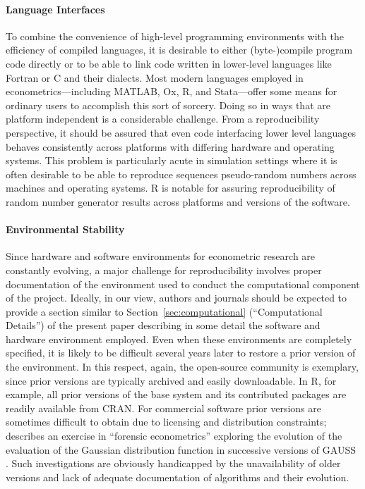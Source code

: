 \documentclass[10pt,a4paper,twoside]{article}
\let\proglang=\textsf
\begin{document}
\paragraph{Language Interfaces}
To combine the convenience of high-level programming environments with 
the efficiency of compiled languages, it is desirable to either (byte-)compile
program code directly or to be able to link code written in lower-level
languages like \proglang{Fortran} or \proglang{C} and their dialects.
Most modern languages employed in econometrics---including \proglang{MATLAB},
\proglang{Ox}, \proglang{R}, and \proglang{Stata}---offer some means
for ordinary users to accomplish this sort of sorcery. Doing so in ways that
are platform independent is a considerable challenge. From a reproducibility
perspective, it should be assured that even code interfacing lower level languages
behaves consistently across platforms with differing hardware and operating systems.
This problem is particularly acute in simulation settings where it is often
desirable to be able to reproduce sequences pseudo-random numbers across machines
and operating systems. \proglang{R} is notable for assuring reproducibility
of random number generator results across platforms and versions of the software.
 
\paragraph{Environmental Stability}
Since hardware and software environments for econometric research are constantly
evolving, a major challenge for reproducibility involves proper documentation of 
the environment used to conduct the computational component of the project.  Ideally,
in our view, authors and journals should be expected to provide a section similar to
Section~\ref{sec:computational} (``Computational Details'') of the present paper
describing in some detail the software and hardware environment employed. 
Even when these environments are completely specified, it is likely to be difficult
several years later to restore
a prior version of the environment.  In this respect, again, the open-source
community is exemplary, since prior versions are typically archived and easily
downloadable.  In \proglang{R}, for example, all prior versions of the base
system and its contributed packages are readily available from CRAN.
For commercial software prior versions are sometimes difficult to obtain due to
licensing and distribution constraints; \cite{repro:Zeileis+Kleiber:2005} describes 
an exercise in ``forensic econometrics'' exploring the evolution of the evaluation
of the Gaussian distribution function in successive versions of
\proglang{GAUSS} \citep[\url{http://www.Aptech.com/}]{repro:GAUSS:2006}.
Such investigations are obviously handicapped by the unavailability of older versions
and lack of adequate documentation of algorithms and their evolution.
\end{document}
